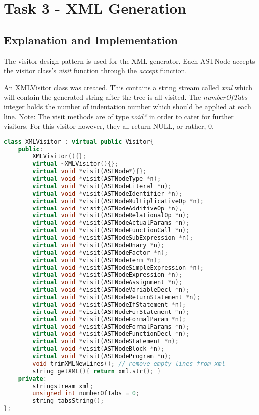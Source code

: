 \section{Task 3 - XML Generation}
\subsection{Explanation and Implementation}

The visitor design pattern is used for the XML generator. Each ASTNode accepts the visitor class's \textit{visit} function through the \textit{accept} function.

An XMLVisitor class was created. This contains a string stream called \textit{xml} which will contain the generated string after the tree is all visited. The \textit{numberOfTabs} integer holds the number of indentation number which should be applied at each line. Note: The visit methods are of type \textit{void*} in order to cater for further visitors. For this visitor however, they all return NULL, or rather, 0.

\begin{lstlisting}[language=C++]
class XMLVisitor : virtual public Visitor{
	public:
		XMLVisitor(){};
		virtual ~XMLVisitor(){};
		virtual void *visit(ASTNode*){};
		virtual void *visit(ASTNodeType *n);
		virtual void *visit(ASTNodeLiteral *n);
		virtual void *visit(ASTNodeIdentifier *n);
		virtual void *visit(ASTNodeMultiplicativeOp *n);
		virtual void *visit(ASTNodeAdditiveOp *n);
		virtual void *visit(ASTNodeRelationalOp *n);
		virtual void *visit(ASTNodeActualParams *n);
		virtual void *visit(ASTNodeFunctionCall *n);
		virtual void *visit(ASTNodeSubExpression *n);
		virtual void *visit(ASTNodeUnary *n);
		virtual void *visit(ASTNodeFactor *n);
		virtual void *visit(ASTNodeTerm *n);
		virtual void *visit(ASTNodeSimpleExpression *n);
		virtual void *visit(ASTNodeExpression *n);
		virtual void *visit(ASTNodeAssignment *n);
		virtual void *visit(ASTNodeVariableDecl *n);
		virtual void *visit(ASTNodeReturnStatement *n);
		virtual void *visit(ASTNodeIfStatement *n);
		virtual void *visit(ASTNodeForStatement *n);
		virtual void *visit(ASTNodeFormalParam *n);
		virtual void *visit(ASTNodeFormalParams *n);
		virtual void *visit(ASTNodeFunctionDecl *n);
		virtual void *visit(ASTNodeStatement *n);
		virtual void *visit(ASTNodeBlock *n);
		virtual void *visit(ASTNodeProgram *n);
		void trimXMLNewLines(); // remove empty lines from xml
		string getXML(){ return xml.str(); }
	private:
		stringstream xml;
		unsigned int numberOfTabs = 0;
		string tabsString();
};
\end{lstlisting}

